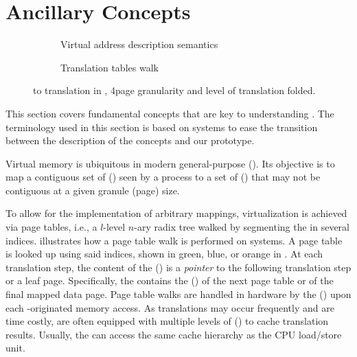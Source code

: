 \section{Ancillary Concepts}

    \begin{figure}
        \begin{subfigure}{\linewidth}
        \centering
            \resizebox{\linewidth}{!}{}
            \caption{Virtual address description semantics}
            \label{fig:va}
        \end{subfigure}
        \begin{subfigure}{\linewidth}
        \centering
            \resizebox{\linewidth}{!}{}
            \caption{Translation tables walk}
            \label{fig:translation}
        \end{subfigure}
        \caption{\va to \pa translation in , 4\kb page granularity and  level of translation folded.}
        \label{fig:mmu}
        \vspace{-0.5cm}
    \end{figure}


    This section covers fundamental concepts that are key to understanding \sname.
    The terminology used in this section is based on  systems to ease the transition between the description of the concepts and our prototype.
    
        Virtual memory is ubiquitous in modern general-purpose \oslong (\os).
        Its objective is to map a contiguous set of  (\va) seen by a process to a set of  (\pa) that may not be contiguous at a given granule (page) size.

        To allow for the implementation of arbitrary mappings, virtualization is achieved via page tables, i.e., a $l$-level $n$-ary radix tree walked by segmenting the \va in several indices.  illustrates how a page table walk is performed on  systems. A page table is looked up using said indices, shown in green, blue, or orange in . At each translation step, the content of the \ptelong (\pte) is a \emph{pointer} to the following translation step or a leaf page. Specifically, the \pte contains the \pfnlong (\pfn) of the next page table or of the final mapped data page.
        Page table walks are handled in hardware by the \mmulong (\mmu) upon each \cpu-originated \va memory access. As translations may occur frequently and are time costly,  are often equipped with multiple levels of \tlblong (\tlb) to cache translation results. Usually, the  can access the same cache hierarchy as the CPU load/store unit.
    
